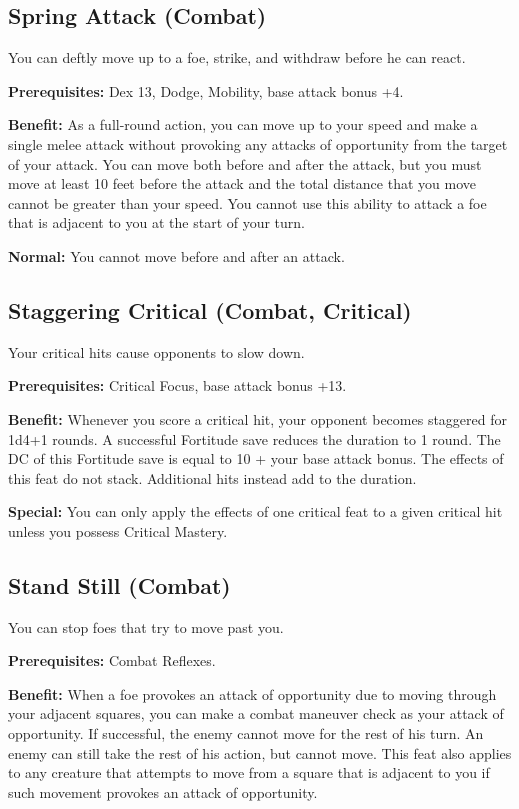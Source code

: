 \subsection{Spring Attack (Combat)}

				
You can deftly move up to a foe, strike, and withdraw before he can react.
				
\textbf{Prerequisites:} Dex 13, Dodge, Mobility, base attack bonus +4.
				
\textbf{Benefit:} As a full-round action, you can move up to your speed and make a single melee attack without provoking any attacks of opportunity from the target of your attack. You can move both before and after the attack, but you must move at least 10 feet before the attack and the total distance that you move cannot be greater than your speed. You cannot use this ability to attack a foe that is adjacent to you at the start of your turn.
				
\textbf{Normal:} You cannot move before and after an attack.
				
\subsection{Staggering Critical (Combat, Critical)}

				
Your critical hits cause opponents to slow down.
				
\textbf{Prerequisites:} Critical Focus, base attack bonus +13.
				
\textbf{Benefit:} Whenever you score a critical hit, your opponent becomes staggered for 1d4+1 rounds. A successful Fortitude save reduces the duration to 1 round. The DC of this Fortitude save is equal to 10 + your base attack bonus. The effects of this feat do not stack. Additional hits instead add to the duration.
				
\textbf{Special:} You can only apply the effects of one critical feat to a given critical hit unless you possess Critical Mastery.
				
\subsection{Stand Still (Combat)}

				
You can stop foes that try to move past you.
				
\textbf{Prerequisites:} Combat Reflexes.
				
\textbf{Benefit:} When a foe provokes an attack of opportunity due to moving through your adjacent squares, you can make a combat maneuver check as your attack of opportunity. If successful, the enemy cannot move for the rest of his turn. An enemy can still take the rest of his action, but cannot move. This feat also applies to any creature that attempts to move from a square that is adjacent to you if such movement provokes an attack of opportunity.
				
